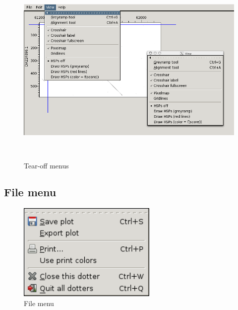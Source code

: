 \documentclass[letterpaper]{article}
\begin{document}
\begin{figure}
 \centering
 \color[rgb]{0.30980393,0.5058824,0.7411765}
 \includegraphics[width=15.24cm,height=9.47cm]{img_menu_tear_off.png}
 \caption{Tear-off menus}
\end{figure}

\bigskip

{\color[rgb]{0.30980393,0.5058824,0.7411765}\subsection[File menu]{File menu}}

\begin{figure}
 \centering
 \color[rgb]{0.30980393,0.5058824,0.7411765}
 \includegraphics[width=6.69cm,height=4.685cm]{img_menu_file.png}
 \caption{File menu}
\end{figure}
\end{document}
